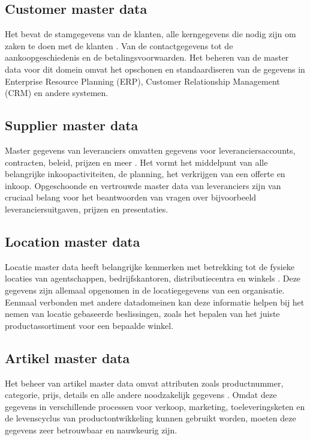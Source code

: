 \subsection{Customer master data}
Het bevat de stamgegevens van de klanten, alle kerngegevens die nodig zijn om zaken te doen met de klanten \autocite{SAPMasterData}. Van de contactgegevens tot de aankoopgeschiedenis en de betalingsvoorwaarden. Het beheren van de master data voor dit domein omvat het opschonen en standaardiseren van de gegevens in Enterprise Resource Planning (ERP), Customer Relationship Management (CRM) en andere systemen.

\subsection{Supplier master data}
Master gegevens van leveranciers omvatten gegevens voor leveranciersaccounts, contracten, beleid, prijzen en meer \autocite{SAPMasterData}. Het vormt het middelpunt van alle belangrijke inkoopactiviteiten, de planning, het verkrijgen van een offerte en inkoop. Opgeschoonde en vertrouwde master data van leveranciers zijn van cruciaal belang voor het beantwoorden van vragen over bijvoorbeeld leveranciersuitgaven, prijzen en presentaties. 

\subsection{Location master data}
Locatie master data heeft belangrijke kenmerken met betrekking tot de fysieke locaties van agentschappen, bedrijfskantoren, distributiecentra en winkels \autocite{SAPMasterData}. Deze gegevens zijn allemaal opgenomen in de locatiegegevens van een organisatie. Eenmaal verbonden met andere datadomeinen kan deze informatie helpen bij het nemen van locatie gebaseerde beslissingen, zoals het bepalen van het juiste productassortiment voor een bepaalde winkel.

\subsection{Artikel master data}
Het beheer van artikel master data omvat attributen zoals productnummer, categorie, prijs, details en alle andere noodzakelijk gegevens \autocite{SAPMasterData}. Omdat deze gegevens in verschillende processen voor verkoop, marketing, toeleveringsketen en de levenscyclus van productontwikkeling kunnen gebruikt worden, moeten deze gegevens zeer betrouwbaar en nauwkeurig zijn.

